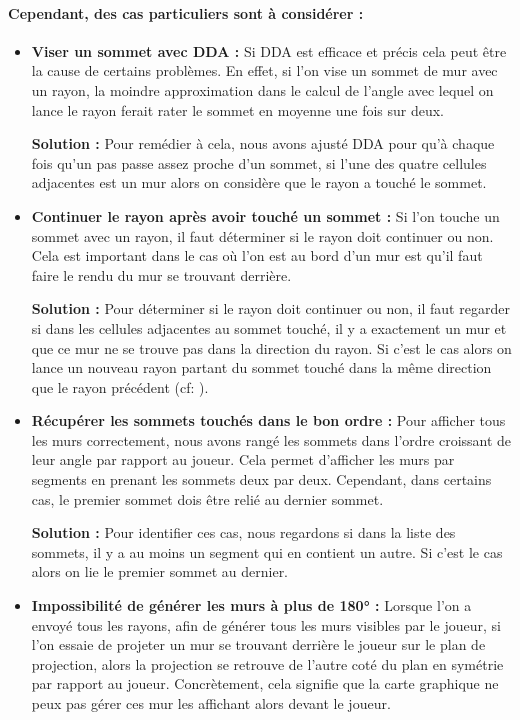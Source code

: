 \documentclass[11pt]{article}
\begin{document}
\paragraph{Cependant, des cas particuliers sont à considérer :}
\begin{itemize}
	\item \textbf{Viser un sommet avec DDA : } Si DDA est efficace et précis cela peut être la cause de certains problèmes. 
	En effet, si l'on vise un sommet de mur avec un rayon, la moindre approximation dans le calcul de l'angle avec lequel on 
	lance le rayon ferait rater le sommet en moyenne une fois sur deux.

	\textbf{Solution : }Pour remédier à cela, nous avons ajusté DDA pour qu'à chaque fois qu'un pas
	passe assez proche d'un sommet, si l'une des quatre cellules adjacentes est
	un mur alors on considère que le rayon a touché le sommet.

	\item \textbf{Continuer le rayon après avoir touché un sommet :} Si l'on touche un sommet avec 
	un rayon, il faut déterminer si le rayon doit continuer ou non. Cela est important dans le cas où l'on 
	est au bord d'un mur est qu'il faut faire le rendu du mur se trouvant derrière.

	\textbf{Solution : }Pour déterminer si le rayon doit continuer ou non, il faut regarder si
	dans les cellules adjacentes au sommet touché, il y a exactement un mur et que ce mur
	ne se trouve pas dans la direction du rayon. Si c'est le cas alors on lance un nouveau rayon 
	partant du sommet touché dans la même direction que le rayon précédent (cf: ).

	\item \textbf{Récupérer les sommets touchés dans le bon ordre :} Pour afficher tous les murs correctement,
	nous avons rangé les sommets dans l'ordre croissant de leur angle par rapport au joueur. Cela permet d'afficher
	les murs par segments en prenant les sommets deux par deux. Cependant, dans certains cas, le premier sommet 
	dois être relié au dernier sommet.

	\textbf{Solution : }Pour identifier ces cas, nous regardons si dans la liste des sommets, il y a au moins
	un segment qui en contient un autre. Si c'est le cas alors on lie le premier sommet au dernier.

	\item \textbf{Impossibilité de générer les murs à plus de 180° :} Lorsque l'on a envoyé tous les rayons,
	afin de générer tous les murs visibles par le joueur, si l'on essaie de projeter un mur se trouvant derrière
	le joueur sur le plan de projection, alors la projection se retrouve de l'autre coté du plan en symétrie 
	par rapport au joueur. Concrètement, cela signifie que la carte graphique ne peux pas gérer ces mur les
	affichant alors devant le joueur.


\end{itemize}
\end{document}
